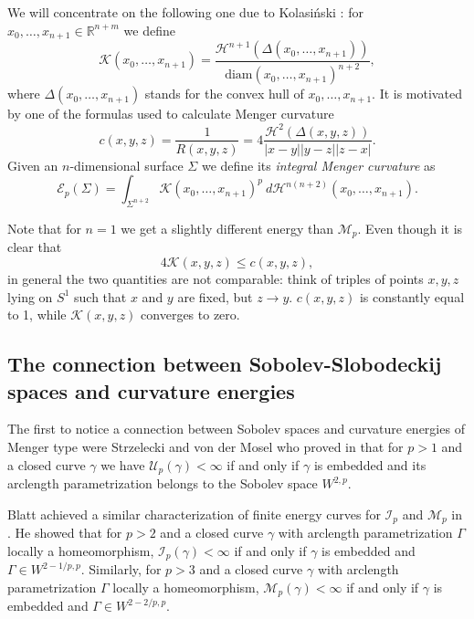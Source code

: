 \documentclass[11pt]{amsart}
\newcommand{\R}{\mathbb{R}}
\renewcommand{\H}{\mathscr{H}}
\newcommand{\Mp}{\mathscr{M}_p}
\newcommand{\diam}{\mathrm{diam}}
\newcommand{\Ep}{\mathcal{E}_p}
\newcommand{\K}{\mathcal{K}}
\theoremstyle{definition}
\begin{document}
	We will concentrate on the following one due to Kolasiński \cite{kolasinski2012thesis}:
	for $x_0,\dots,x_{n+1}\in\R^{n+m}$ we define
	\[
	\mathcal{K}(x_0,\dots,x_{n+1}) = \frac{\H^{n+1}(\Delta(x_0,\dots,x_{n+1}))}{\diam(x_0,\dots,x_{n+1})^{n+2}},
	\]
	where $\Delta(x_0,\dots,x_{n+1})$ stands for the convex hull of $x_0,\dots,x_{n+1}$. It is motivated by one of the formulas used to calculate Menger curvature
	\[c(x,y,z)=\frac{1}{R(x,y,z)}=4\frac{\H^2(\Delta(x,y,z))}{|x-y||y-z||z-x|}.
	\]
	Given an $n$-dimensional surface $\Sigma$ we define its \emph{integral Menger curvature} as
	\[
	\Ep(\Sigma) = \int_{\Sigma^{n+2}} \mathcal{K}(x_0,\dots,x_{n+1})^p\ d\H^{n(n+2)}(x_0,\dots,x_{n+1}). %
	\]
	
	Note that for $n=1$ we get a slightly different energy than $\Mp$. Even though it is clear that
	\[4\K(x,y,z)\leq c(x,y,z),
	\]
	in general the two quantities are not comparable: think of triples of points $x,y,z$ lying on $S^1$ such that $x$ and $y$ are fixed, but $z\rightarrow y$. $c(x,y,z)$ is constantly equal to 1, while $\K(x,y,z)$ converges to zero.
	
	
	\subsection*{The connection between Sobolev-Slobodeckij spaces and curvature energies}
	The first to notice a connection between Sobolev spaces and curvature energies of Menger type were Strzelecki and von der Mosel who proved in \cite{strzelecki2007rectifiable} that for $p>1$ and a closed curve $\gamma$ we have $\mathscr{U}_p(\gamma)<\infty$ if and only if $\gamma$ is embedded and its arclength parametrization belongs to the Sobolev space $W^{2,p}$.
	
	Blatt achieved a similar characterization of finite energy curves for $\mathscr{I}_p$ and $\Mp$ in \cite{blatt2013note}. He showed that for $p>2$ and a closed curve $\gamma$ with arclength parametrization $\Gamma$ locally a homeomorphism, $\mathscr{I}_p(\gamma)<\infty$ if and only if $\gamma$ is embedded and $\Gamma\in W^{2-1/p,p}$. Similarly, for $p>3$  and a closed curve $\gamma$ with arclength parametrization $\Gamma$ locally a homeomorphism, $\mathscr{M}_p(\gamma)<\infty$ if and only if $\gamma$ is embedded and $\Gamma\in W^{2-2/p,p}$.
	
\end{document}
